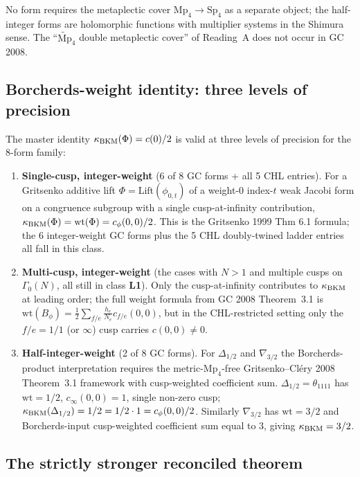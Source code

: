 No form requires the metaplectic cover $\mathrm{Mp}_4 \to \mathrm{Sp}_4$
as a separate object; the half-integer forms are holomorphic functions
with multiplier systems in the Shimura sense. The
``$\widetilde{\mathrm{Mp}}_4$ double metaplectic cover'' of Reading~A
does not occur in GC 2008.

\subsection*{Borcherds-weight identity: three levels of precision}

The master identity $\kappa_{\mathrm{BKM}}(\Phi) = c(0)/2$ is valid at three levels of
precision for the 8-form family:

\begin{enumerate}
\item[\textbf{(L1)}] \textbf{Single-cusp, integer-weight} (6 of 8 GC
forms + all 5 CHL entries). For a Gritsenko additive lift $\Phi =
\mathrm{Lift}(\phi_{0, t})$ of a weight-$0$ index-$t$ weak Jacobi
form on a congruence subgroup with a single cusp-at-infinity
contribution, $\kappa_{\mathrm{BKM}}(\Phi) = \mathrm{wt}(\Phi) = c_\phi(0, 0)/2$. This
is the Gritsenko 1999 Thm 6.1 formula; the 6 integer-weight GC forms
plus the 5 CHL doubly-twined ladder entries all fall in this class.

\item[\textbf{(L2)}] \textbf{Multi-cusp, integer-weight} (the cases
with $N > 1$ and multiple cusps on $\Gamma_0(N)$, all still in class
\textbf{L1}). Only the cusp-at-infinity contributes to $\kappa_{\mathrm{BKM}}$ at
leading order; the full weight formula from GC 2008 Theorem~3.1 is
$\mathrm{wt}(B_\phi) = \tfrac{1}{2} \sum_{f/e} \tfrac{h_e}{N_e}
c_{f/e}(0, 0)$, but in the CHL-restricted setting only the $f/e = 1/1$
(or $\infty$) cusp carries $c(0, 0) \neq 0$.

\item[\textbf{(L3)}] \textbf{Half-integer-weight} (2 of 8 GC forms).
For $\Delta_{1/2}$ and $\nabla_{3/2}$ the Borcherds-product
interpretation requires the metric-$\mathrm{Mp}_4$-free
Gritsenko--Cl\'ery 2008 Theorem~3.1 framework with cusp-weighted
coefficient sum. $\Delta_{1/2} = \theta_{1111}$ has
$\mathrm{wt} = 1/2$, $c_{\infty}(0, 0) = 1$, single non-zero cusp;
$\kappa_{\mathrm{BKM}}(\Delta_{1/2}) = 1/2 = 1/2 \cdot 1 = c_\phi(0, 0)/2$. Similarly
$\nabla_{3/2}$ has $\mathrm{wt} = 3/2$ and Borcherds-input cusp-weighted
coefficient sum equal to $3$, giving $\kappa_{\mathrm{BKM}} = 3/2$.
\end{enumerate}

\subsection*{The strictly stronger reconciled theorem}


